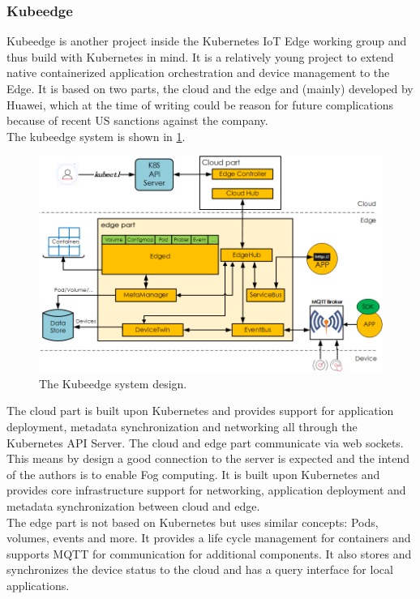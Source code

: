 \subsubsection{Kubeedge}
Kubeedge is another project inside the Kubernetes IoT Edge working group and thus build with Kubernetes in mind. It is a relatively young project to extend native containerized application orchestration and device management to the Edge. It is based on two parts, the cloud and the edge and (mainly) developed by Huawei, which at the time of writing could be reason for future complications because of recent US sanctions against the company.\\
The kubeedge system is shown in \cref{fig:kubeedgeStruct}.
\begin{figure}[h!]
    \centering
    \includegraphics[width=(\textwidth+4cm)/2]{figures/kubeedge_arch.png}
    \caption{The Kubeedge system design.}
    \label{fig:kubeedgeStruct}
\end{figure}
The cloud part is built upon Kubernetes and provides support for application deployment, metadata synchronization and networking all through the Kubernetes API Server. The cloud and edge part communicate via web sockets. This means by design a good connection to the server is expected and the intend of the authors is to enable Fog computing. It is built upon Kubernetes and provides core infrastructure support for networking, application deployment and metadata synchronization between cloud and edge.\\
The edge part is not based on Kubernetes but uses similar concepts: Pods, volumes, events and more. It provides a life cycle management for containers and supports MQTT for communication for additional components. It also stores and synchronizes the device status to the cloud and has a query interface for local applications.


